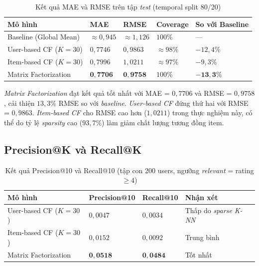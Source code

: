 ﻿\documentclass[../BTL.tex]{subfiles}
\begin{document}
\begin{table}[H]
    \centering
    \caption{Kết quả MAE và RMSE trên tập \textit{test} (temporal split 80/20)}
    \label{tab:mae_rmse}
    \begin{tabular}{lllll}
        \toprule
        \textbf{Mô hình}        & \textbf{MAE} & \textbf{RMSE}
            & \textbf{Coverage} & \textbf{So với Baseline} \\
        \midrule
        Baseline (Global Mean)  & ${\approx}0{,}945$ & ${\approx}1{,}126$
            & $100\%$ & --- \\
        User-based CF ($K=30$)  & $0{,}7746$ & $0{,}9863$
            & ${\approx}98\%$ & $-12{,}4\%$ \\
        Item-based CF ($K=30$)  & $0{,}7996$ & $1{,}0211$
            & ${\approx}97\%$ & $-9{,}3\%$ \\
        Matrix Factorization    & $\mathbf{0{,}7706}$ & $\mathbf{0{,}9758}$
            & $100\%$ & $\mathbf{-13{,}3\%}$ \\
        \bottomrule
    \end{tabular}
\end{table}

\textit{Matrix Factorization} đạt kết quả tốt nhất với MAE = $0{,}7706$ và
RMSE = $0{,}9758$, cải thiện $13{,}3\%$ RMSE so với \textit{baseline}.
\textit{User-based CF} đứng thứ hai với RMSE = $0{,}9863$.
\textit{Item-based CF} cho RMSE cao hơn ($1{,}0211$) trong thực nghiệm này,
có thể do tỷ lệ \textit{sparsity} cao ($93{,}7\%$) làm giảm chất lượng
tương đồng item.

\subsection{Precision@K và Recall@K}
\label{section:3.7.2}

\begin{table}[H]
    \centering
    \caption{Kết quả Precision@10 và Recall@10 (tập con 200 users,
    ngưỡng \textit{relevant} = rating $\geq 4$)}
    \label{tab:pr}
    \begin{tabular}{llll}
        \toprule
        \textbf{Mô hình}        & \textbf{Precision@10}
            & \textbf{Recall@10} & \textbf{Nhận xét} \\
        \midrule
        User-based CF ($K=30$)  & $0{,}0047$ & $0{,}0034$
            & Thấp do \textit{sparse K-NN} \\
        Item-based CF ($K=30$)  & $0{,}0152$ & $0{,}0092$
            & Trung bình \\
        Matrix Factorization    & $\mathbf{0{,}0518}$ & $\mathbf{0{,}0484}$
            & Tốt nhất \\
        \bottomrule
    \end{tabular}
\end{table}
\end{document}
